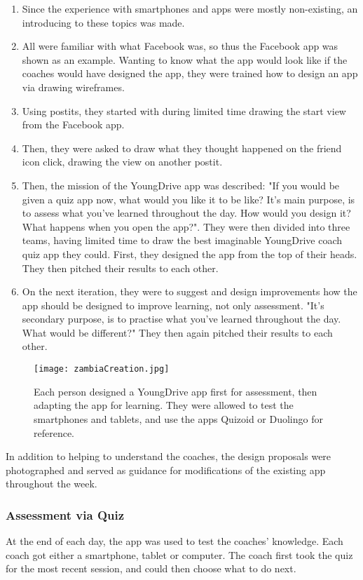 \begin{enumerate}
\item Since the experience with smartphones and apps were mostly non-existing, an introducing to these topics was made.
\item All were familiar with what Facebook was, so thus the Facebook app was shown as an example. Wanting to know what the app would look like if the coaches would have designed the app, they were trained how to design an app via drawing wireframes.
\item Using postits, they started with during limited time drawing the start view from the Facebook app.
\item Then, they were asked to draw what they thought happened on the friend icon click, drawing the view on another postit.
\item Then, the mission of the YoungDrive app was described: "If you would be given a quiz app now, what would you like it to be like? It’s main purpose, is to assess what you’ve learned throughout the day. How would you design it? What happens when you open the app?". They were then divided into three teams, having limited time to draw the best imaginable YoungDrive coach quiz app they could. First, they designed the app from the top of their heads. They then pitched their results to each other.
\item On the next iteration, they were to suggest and design improvements how the app should be designed to improve learning, not only assessment. "It’s secondary purpose, is to practise what you’ve learned throughout the day. What would be different?" They then again pitched their results to each other.
\end{enumerate}

\begin{figure}[h]
    \centering
    \texttt{[image: zambiaCreation.jpg]}
    \caption{Each person designed a YoungDrive app first for assessment, then adapting the app for learning. They were allowed to test the smartphones and tablets, and use the apps Quizoid or Duolingo for reference.}
    \label{fig:zambia}
\end{figure}

In addition to helping to understand the coaches, the design proposals were photographed and served as guidance for modifications of the existing app throughout the week.

\subsubsection{Assessment via Quiz}
At the end of each day, the app was used to test the coaches' knowledge. Each coach got either a smartphone, tablet or computer. The coach first took the quiz for the most recent session, and could then choose what to do next.

